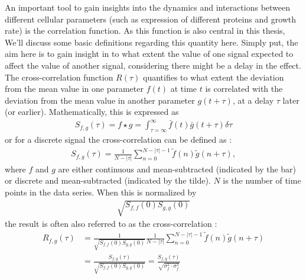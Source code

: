 An important tool to gain insights into the dynamics and interactions between different cellular parameters (such as expression of different proteins and growth rate) is the correlation function.
%
As this function is also central in this thesis, 
We'll discuss some basic definitions regarding this quantity here.
%
Simply put, the aim here is to gain insight in to what extent the value of one signal expected to affect the value of another signal, considering there might be a delay in the effect.
%
The cross-correlation function $R(\tau)$ quantifies to what extent the deviation from the mean value in one parameter $f(t)$ at time $t$ is correlated with the deviation from the mean value in another parameter $g(t+\tau)$, at a delay $\tau$ later (or earlier).
%
Mathematically, this is expressed as \cite[see lemma "Cross-Correlation"]{Weisstein2018}
\begin{align}
	\label{eq:CC}
		S_{f,g}(\tau) = f \star g = \int_{\tau=\infty}^{\infty} {\bar {f}(t) \bar{g}(t+\tau) \delta \tau}
\end{align}
or for a discrete signal the cross-correlation can be defined as \cite{Dunlop2008}:
\begin{align}
	\label{eq:CCdiscrete}
	S_{f,g}(\tau) = \frac{1}{N-|\tau|} 
		\sum_{n=0}^{N-|\tau|-1} {\tilde{f}(n) \tilde{g}(n+\tau)},
\end{align}
where $f$ and $g$ are either continuous and mean-subtracted (indicated by the bar) or discrete and mean-subtracted (indicated by the tilde). 
$N$ is the number of time points in the data series.
%
When this is normalized by 
\begin{align*}
\sqrt{S_{f,f}(0)S_{g,g}(0)}
\end{align*}
the result is often also referred to as the cross-correlation \cite{Munsky2012}:
%
\begin{align}
	\label{eq:R}
R_{f,g}(\tau) 
 	& = \frac{1}{\sqrt{S_{f,f}(0)S_{g,g}(0)}} \frac{1}{N-|\tau|} 
	\sum_{n=0}^{N-|\tau|-1} {\tilde{f}(n) \tilde{g}(n+\tau)} 
	\nonumber \\
	& =	\frac{S_{f,g}(\tau)}{\sqrt{S_{f,f}(0)S_{g,g}(0)}} 
	= \frac{S_{f,g}(\tau)}{\sqrt{\sigma^2_f\cdot\sigma^2_f}}
\end{align}
%
